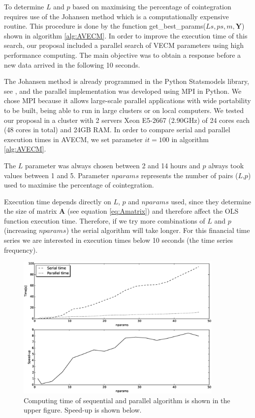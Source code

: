 To determine $L$ and $p$ based on maximising the percentage of cointegration
requires use of the Johansen method which is a computationally expensive
routine. This procedure is done by the function
get\_best\_params($Ls,ps,m,\mathbf{Y}$) shown in algorithm \ref{alg:AVECM}.  In
order to improve the execution time of this search, our proposal included a
parallel search of VECM parameters using high performance computing.  The main
objective was to obtain a response before a new data arrived in the following 10
seconds.

The Johansen method is already programmed in the Python Statsmodels
library, see \cite{seabold2010}, and the parallel implementation was developed using
MPI in Python.  We chose MPI because it allows large-scale parallel applications
with wide portability to be built, being able to run in large clusters or on
local computers.  We tested our proposal in a cluster with 2 servers Xeon
E5-2667 (2.90GHz) of 24 cores each (48 cores in total) and 24GB RAM.  In order
to compare serial and parallel execution times in AVECM, we set parameter
$it=100$ in algorithm \ref{alg:AVECM}.

The $L$ parameter was always chosen between 2 and 14 hours and $p$ always took
values between 1 and 5. Parameter $nparams$ represents the number of pairs
($L$,$p$) used to maximise the percentage of cointegration. 

Execution time depends directly on $L$, $p$ and $nparams$ used, since they
determine the size of matrix $\mathbf{A}$ (see equation \ref{eq:Amatrix}) and
therefore affect the OLS function execution time.  Therefore, if we try more
combinations of $L$ and $p$ (increasing $nparams$) the serial algorithm will
take longer. For this financial time series we are interested in execution times
below 10 seconds  (the time series frequency).

\begin{figure}[ht]
  \centering
  \includegraphics[width=0.9\textwidth]{img/Fig3}
  \caption{Computing time of sequential and parallel algorithm is shown in the
  upper figure. Speed-up is shown below.}
  \label{fig:extimes}
\end{figure}

